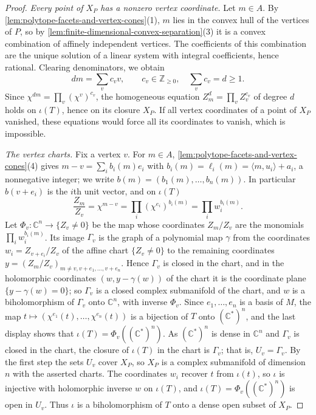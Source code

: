 \begin{proof}
\emph{Every point of $X_P$ has a nonzero vertex coordinate.} Let $m\in A$. By \cref{lem:polytope-facets-and-vertex-cones}(1), $m$ lies in the convex hull of the vertices of $P$, so by \cref{lem:finite-dimensional-convex-separation}(3) it is a convex combination of affinely independent vertices. The coefficients of this combination are the unique solution of a linear system with integral coefficients, hence rational. Clearing denominators, we obtain
\[
 d m=\sum_v c_v v,\qquad c_v\in\mathbb Z_{\geq0},\quad\sum_v c_v=d\geq1.
\]
Since $\chi^{dm}=\prod_v(\chi^v)^{c_v}$, the homogeneous equation $Z_m^d=\prod_v Z_v^{c_v}$ of degree $d$ holds on $\iota(T)$, hence on its closure $X_P$. If all vertex coordinates of a point of $X_P$ vanished, these equations would force all its coordinates to vanish, which is impossible.

\emph{The vertex charts.} Fix a vertex $v$. For $m\in A$, \cref{lem:polytope-facets-and-vertex-cones}(4) gives $m-v=\sum_ib_i(m)e_i$ with $b_i(m)=\ell_i(m)=\langle m,u_i\rangle+a_i$, a nonnegative integer; we write $b(m)=(b_1(m),\ldots,b_n(m))$. In particular $b(v+e_i)$ is the $i$th unit vector, and on $\iota(T)$
\[
 \frac{Z_m}{Z_v}=\chi^{m-v}=\prod_i(\chi^{e_i})^{b_i(m)}=\prod_iw_i^{b_i(m)}.
\]
Let $\Phi_v\colon\mathbb C^n\to\{Z_v\neq0\}$ be the map whose coordinates $Z_m/Z_v$ are the monomials $\prod_iw_i^{b_i(m)}$. Its image $\Gamma_v$ is the graph of a polynomial map $\gamma$ from the coordinates $w_i=Z_{v+e_i}/Z_v$ of the affine chart $\{Z_v\neq0\}$ to the remaining coordinates $y=(Z_m/Z_v)_{m\neq v,v+e_1,\ldots,v+e_n}$. Hence $\Gamma_v$ is closed in the chart, and in the holomorphic coordinates $(w,y-\gamma(w))$ of the chart it is the coordinate plane $\{y-\gamma(w)=0\}$; so $\Gamma_v$ is a closed complex submanifold of the chart, and $w$ is a biholomorphism of $\Gamma_v$ onto $\mathbb C^n$, with inverse $\Phi_v$. Since $e_1,\ldots,e_n$ is a basis of $M$, the map $t\mapsto(\chi^{e_1}(t),\ldots,\chi^{e_n}(t))$ is a bijection of $T$ onto $(\mathbb C^*)^n$, and the last display shows that $\iota(T)=\Phi_v((\mathbb C^*)^n)$. As $(\mathbb C^*)^n$ is dense in $\mathbb C^n$ and $\Gamma_v$ is closed in the chart, the closure of $\iota(T)$ in the chart is $\Gamma_v$; that is, $U_v=\Gamma_v$. By the first step the sets $U_v$ cover $X_P$, so $X_P$ is a complex submanifold of dimension $n$ with the asserted charts. The coordinates $w_i$ recover $t$ from $\iota(t)$, so $\iota$ is injective with holomorphic inverse $w$ on $\iota(T)$, and $\iota(T)=\Phi_v((\mathbb C^*)^n)$ is open in $U_v$. Thus $\iota$ is a biholomorphism of $T$ onto a dense open subset of $X_P$.


\end{proof}
